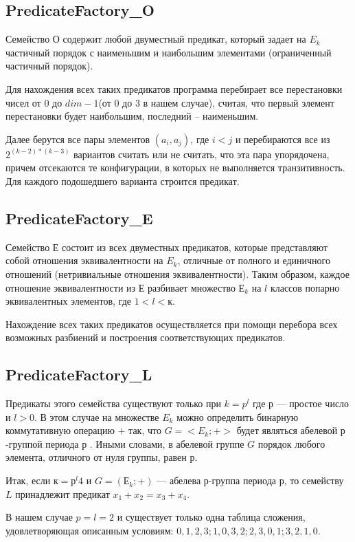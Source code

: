 \documentclass[a4paper,14pt]{extreport}
\begin{document}
\subsection{PredicateFactory\_O}
Семейство $О$ содержит любой двуместный предикат, который задает на $E_k$ частичный порядок с
наименьшим и наибольшим элементами (ограниченный частичный порядок). 

Для нахождения всех таких предикатов программа перебирает все перестановки чисел от $0$ до $dim-1$(от $0$ до $3$ в нашем случае), считая, что первый элемент перестановки будет наибольшим, последний – наименьшим. 

Далее берутся все пары элементов $(a_i,a_j)$, где $i<j$ и перебираются все из $2^{(k-2)*(k-3)}$ вариантов считать или не считать, что эта пара упорядочена, причем отсекаются те конфигурации, в которых не выполняется транзитивность. Для каждого подошедшего варианта строится предикат.

\subsection{PredicateFactory\_E}
Семейство $Е$ состоит из всех двуместных предикатов, которые  представляют собой отношения эквивалентности на $E_k$, отличные от полного и единичного отношений (нетривиальные отношения эквивалентности). Таким образом, каждое отношение эквивалентности из $Е$ разбивает множество $Е_k$ на $l$ классов попарно эквивалентных элементов, где $1 < l < к$. 

Нахождение всех таких предикатов осуществляется при помощи перебора всех возможных разбиений и построения соответствующих предикатов. 

\subsection{PredicateFactory\_L}
Предикаты этого семейства существуют только при $k = p^l$ где $р$ — простое число и $l > 0$. В этом случае на множестве $E_k$ можно определить бинарную коммутативную операцию $+$ так, 
что $G = <E_k;+>$ будет являться абелевой $р$-группой периода $р$ . Иными словами, в абелевой группе $G$ порядок любого элемента, отличного от нуля группы, равен $р$. 

Итак, если $к = р^l4$ и $G = (Е_k; +)$ — абелева $р$-группа периода $р$, то семейству $L$ принадлежит предикат $x_1+x_2=x_3+x_4$. 

В нашем случае $p=l=2$ и существует только одна таблица сложения, удовлетворяющая описанным условиям: ${{0, 1, 2, 3};{1, 0, 3, 2};{2, 3, 0, 1};{3, 2, 1, 0}}$. 
\end{document}
